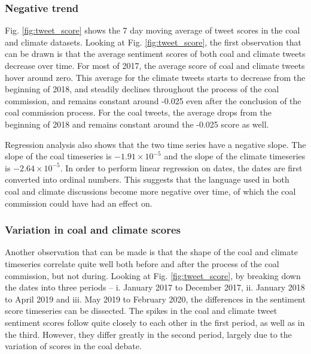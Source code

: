 \documentclass[12pt,onecolumn,twoside]{layout}
\begin{document}
\subsubsection*{Negative trend} %
Fig. \ref{fig:tweet_score} shows the 7 day moving average of tweet scores in the coal and climate datasets. Looking at Fig. \ref{fig:tweet_score}, the first observation that can be drawn is that the average sentiment scores of both coal and climate tweets decrease over time. For most of 2017, the average score of coal and climate tweets hover around zero. This average for the climate tweets starts to decrease from the beginning of 2018, and steadily declines throughout the process of the coal commission, and remains constant around -0.025 even after the conclusion of the coal commission process. For the coal tweets, the average drops from the beginning of 2018 and remains constant around the -0.025 score as well.

Regression analysis also shows that the two time series have a negative slope. The slope of the coal timeseries is $-1.91 \times 10^{-5}$ and the slope of the climate timeseries is $-2.64 \times 10^{-5}$. In order to perform linear regression on dates, the dates are first converted into ordinal numbers. This suggests that the language used in both coal and climate discussions become more negative over time, of which the coal commission could have had an effect on.

\subsubsection*{Variation in coal and climate scores} %
Another observation that can be made is that the shape of the coal and climate timeseries correlate quite well both before and after the process of the coal commission, but not during. Looking at Fig. \ref{fig:tweet_score}, by breaking down the dates into three periods -- i. January 2017 to December 2017, ii. January 2018 to April 2019 and iii. May 2019 to February 2020, the differences in the sentiment score timeseries can be dissected. The spikes in the coal and climate tweet sentiment scores follow quite closely to each other in the first period, as well as in the third. However, they differ greatly in the second period, largely due to the variation of scores in the coal debate.
\end{document}
